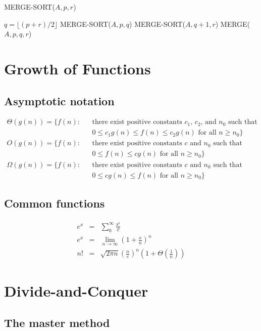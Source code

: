 \documentclass[12pt]{article}
\begin{document}
MERGE-SORT($A, p, r$)
\begin{algorithmic}[1]
	\State $q = \lfloor (p+r)/2 \rfloor$
        \State MERGE-SORT($A, p, q$)
        \State MERGE-SORT($A, q+1, r$)
        \State MERGE($A, p, q, r$)
\EndIf
\end{algorithmic}

\section{Growth of Functions}

\subsection{Asymptotic notation}

\begin{eqnarray*}
  \Theta (g(n)) = \{ f(n): && \text{there exist positive constants
    $c_1$, $c_2$, and $n_0$ such that} \\
  && 0 \le c_1 g(n) \le f(n) \le c_2 g(n) \text{ for all } n \ge n_0 \} \\
  O(g(n)) = \{ f(n): && \text{there exist positive constants
    $c$ and $n_0$ such that} \\
  && 0 \le f(n) \le cg(n) \text{ for all } n \ge n_0 \} \\
  \Omega (g(n)) = \{ f(n): && \text{there exist positive constants
    $c$ and $n_0$ such that} \\
  && 0 \le cg(n) \le f(n) \text{ for all } n \ge n_0 \}
\end{eqnarray*}

\subsection{Common functions}

\begin{eqnarray*}
  e^x &=& \sum_0^{\infty} \frac {x^i}{i!} \\
  e^x &=& \lim_{n \rightarrow \infty} (1 + \frac {x}{n})^n \\
  n!  &=& \sqrt {2 \pi n} \left(\frac {n}{e} \right)^n 
          \left( 1 + \Theta \left( \frac {1}{n} \right) \right)
\end{eqnarray*}

\section{Divide-and-Conquer}

\subsection{The master method}
\end{document}

